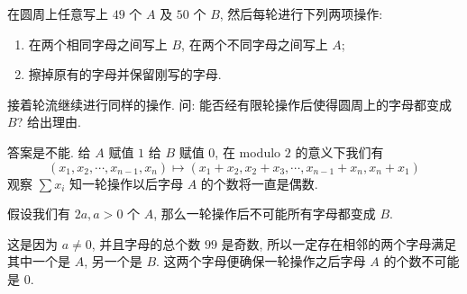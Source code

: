 \begin{prob}
\label{prob:prob-8}
在圆周上任意写上 $49$ 个 $A$ 及 $50$ 个 $B$,
然后每轮进行下列两项操作:
\begin{enumerate}[label=(\roman*)]
  \item 在两个相同字母之间写上 $B$,
    在两个不同字母之间写上 $A$;
  \item 擦掉原有的字母并保留刚写的字母.
\end{enumerate}
接着轮流继续进行同样的操作. 问:
能否经有限轮操作后使得圆周上的字母都变成 $B$? 给出理由.
\end{prob}

\begin{soln}
答案是不能. 给 $A$ 赋值 $1$ 给 $B$ 赋值 $0$,
在 modulo $2$ 的意义下我们有
\[
(x_1, x_2, \cdots, x_{n-1}, x_n) \mapsto
(x_1 + x_2, x_2 + x_3, \cdots, x_{n-1} + x_n, x_n + x_1)
\]
观察 $\sum x_i$ 知一轮操作以后字母 $A$ 的个数将一直是偶数.

\begin{claim}
假设我们有 $2a, a > 0$ 个 $A$,
那么一轮操作后不可能所有字母都变成 $B$.
\end{claim}

\medskip

这是因为 $a \ne 0$, 并且字母的总个数 $99$ 是奇数,
所以一定存在相邻的两个字母满足其中一个是 $A$, 另一个是 $B$.
这两个字母便确保一轮操作之后字母 $A$ 的个数不可能是 $0$.
\end{soln}
